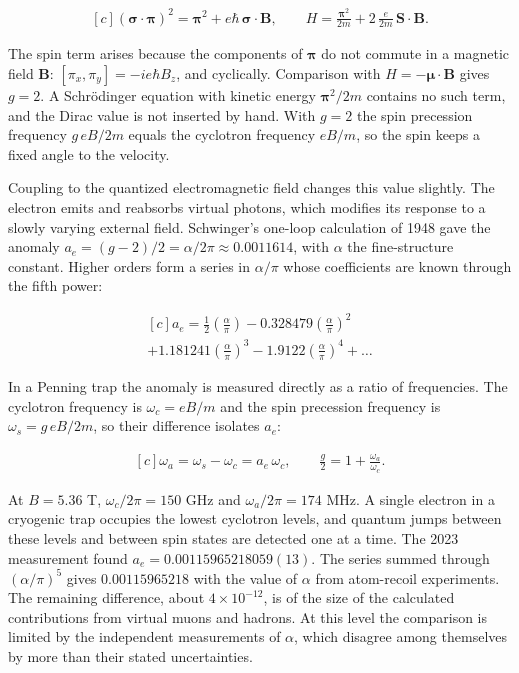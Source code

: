 \documentclass[11pt,oneside]{book}
\newenvironment{centeredalign}{\[\begin{gathered}[c]}{\end{gathered}\]}
\begin{document}
\begin{centeredalign}
(\boldsymbol\sigma\cdot\boldsymbol\pi)^2=\boldsymbol\pi^2+e\hbar\,\boldsymbol\sigma\cdot\mathbf B,
\qquad
H=\frac{\boldsymbol\pi^2}{2m}+2\,\frac{e}{2m}\,\mathbf S\cdot\mathbf B.
\end{centeredalign}

The spin term arises because the components of \(\boldsymbol\pi\) do not commute in a magnetic field \(\mathbf B\): \([\pi_x,\pi_y]=-ie\hbar B_z\), and cyclically. Comparison with \(H=-\boldsymbol\mu\cdot\mathbf B\) gives \(g=2\). A Schrödinger equation with kinetic energy \(\boldsymbol\pi^2/2m\) contains no such term, and the Dirac value is not inserted by hand. With \(g=2\) the spin precession frequency \(g\,eB/2m\) equals the cyclotron frequency \(eB/m\), so the spin keeps a fixed angle to the velocity.

Coupling to the quantized electromagnetic field changes this value slightly. The electron emits and reabsorbs virtual photons, which modifies its response to a slowly varying external field. Schwinger's one-loop calculation of 1948 gave the anomaly \(a_e=(g-2)/2=\alpha/2\pi\approx0.0011614\), with \(\alpha\) the fine-structure constant. Higher orders form a series in \(\alpha/\pi\) whose coefficients are known through the fifth power:

\begin{centeredalign}
a_e=\frac12\left(\frac{\alpha}{\pi}\right)-0.328479\left(\frac{\alpha}{\pi}\right)^2\\
+1.181241\left(\frac{\alpha}{\pi}\right)^3-1.9122\left(\frac{\alpha}{\pi}\right)^4+\dots
\end{centeredalign}

In a Penning trap the anomaly is measured directly as a ratio of frequencies. The cyclotron frequency is \(\omega_c=eB/m\) and the spin precession frequency is \(\omega_s=g\,eB/2m\), so their difference isolates \(a_e\):

\begin{centeredalign}
\omega_a=\omega_s-\omega_c=a_e\,\omega_c,\qquad
\frac{g}{2}=1+\frac{\omega_a}{\omega_c}.
\end{centeredalign}

At \(B=5.36\) T, \(\omega_c/2\pi=150\) GHz and \(\omega_a/2\pi=174\) MHz. A single electron in a cryogenic trap occupies the lowest cyclotron levels, and quantum jumps between these levels and between spin states are detected one at a time. The 2023 measurement found \(a_e=0.00115965218059(13)\). The series summed through \((\alpha/\pi)^5\) gives \(0.00115965218\) with the value of \(\alpha\) from atom-recoil experiments. The remaining difference, about \(4\times10^{-12}\), is of the size of the calculated contributions from virtual muons and hadrons. At this level the comparison is limited by the independent measurements of \(\alpha\), which disagree among themselves by more than their stated uncertainties.
\end{document}
